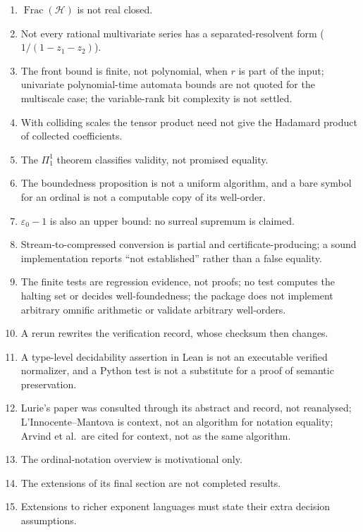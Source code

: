 \documentclass[11pt,oneside]{article}
\numberwithin{equation}{section}
\theoremstyle{definition}
\theoremstyle{remark}
\newcommand{\FH}{\operatorname{Frac}(\mathcal H)}
\begin{document}
\begin{enumerate}[leftmargin=*,widest=00,label=05.\arabic*]
hidden.
\item $\FH$ is not real closed.
\item Not every rational multivariate series has a separated-resolvent form
($1/(1-z_1-z_2)$).
\item The front bound is finite, not polynomial, when $r$ is part of the input;
univariate polynomial-time automata bounds are not quoted for the multiscale case;
the variable-rank bit complexity is not settled.
\item With colliding scales the tensor product need not give the Hadamard product
of collected coefficients.
\item The $\Pi^1_1$ theorem classifies validity, not promised equality.
\item The boundedness proposition is not a uniform algorithm, and a bare symbol
for an ordinal is not a computable copy of its well-order.
\item $\varepsilon_0-1$ is also an upper bound: no surreal supremum is claimed.
\item Stream-to-compressed conversion is partial and certificate-producing; a
sound implementation reports ``not established'' rather than a false equality.
\item The finite tests are regression evidence, not proofs; no test computes the
halting set or decides well-foundedness; the package does not implement arbitrary
omnific arithmetic or validate arbitrary well-orders.
\item A rerun rewrites the verification record, whose checksum then changes.
\item A type-level decidability assertion in Lean is not an executable verified
normalizer, and a Python test is not a substitute for a proof of semantic
preservation.
\item Lurie's paper was consulted through its abstract and record, not reanalysed;
L'Innocente--Mantova is context, not an algorithm for notation equality; Arvind et
al.\ are cited for context, not as the same algorithm.
\item The ordinal-notation overview is motivational only.
\item The extensions of its final section are not completed results.
\item Extensions to richer exponent languages must state their extra decision
assumptions.
\end{enumerate}
\end{document}

